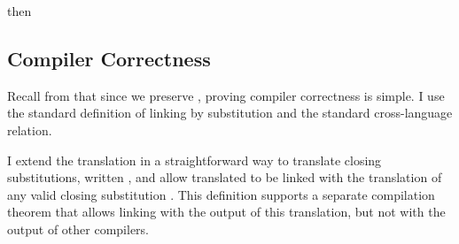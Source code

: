{\begin{theorem}
  \label{thm:cps:cbn:type-pres}
  \im{\styjudg{\slenv}{\st}{\stpr}} then
  \im{\styjudg{\slenv^{+}}{\cpsterm{\st}}{\cpstype{\stpr}}}
\end{theorem}

\subsection{Compiler Correctness}
\label{sec:cps:cbn:correct}
Recall from  that since we preserve
, proving compiler correctness is simple.
I use the standard definition of linking by substitution and the standard
cross-language relation.

I extend the \cbnname{} translation in a straightforward way to translate closing
substitutions, written \im{\ssubst^\div}, and allow translated  to
be linked with the translation of any valid closing substitution \im{\ssubst}.
This definition supports a separate compilation theorem that allows linking with
the output of this translation, but not with the output of other compilers.

}
